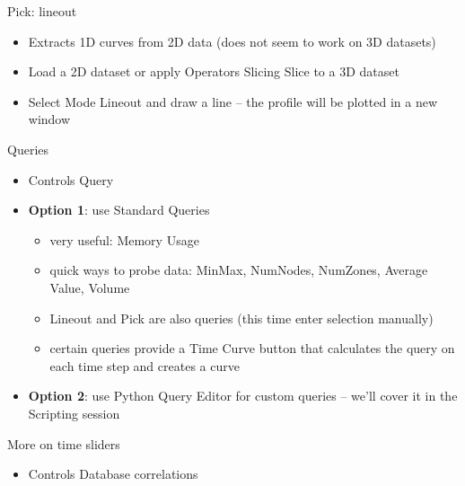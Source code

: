 \begin{frame}{Pick: lineout}
  \begin{itemize}\setlength{\itemsep}{2mm}
  \item Extracts 1D curves from 2D data (does not seem to work on 3D datasets)
  \item Load a 2D dataset or apply Operators \ra Slicing \ra Slice to a 3D dataset
  \item Select Mode \ra Lineout and draw a line -- the profile will be plotted in a new window
  \end{itemize}
\end{frame}

\begin{frame}{Queries}
  \begin{itemize}\setlength{\itemsep}{2mm}
  \item Controls \ra Query
  \item {\bf Option 1}: use Standard Queries
    \begin{itemize}\setlength{\itemsep}{0mm}
    \item very useful: Memory Usage
    \item quick ways to probe data: MinMax, NumNodes, NumZones, Average Value, Volume
    \item Lineout and Pick are also queries (this time enter selection manually)
    \item certain queries provide a Time Curve button that calculates the query on each time step and
      creates a curve
    \end{itemize}
  \item {\bf Option 2}: use Python Query Editor for custom queries -- we'll cover it in the Scripting
    session
  \end{itemize}
\end{frame}

\begin{frame}{More on time sliders}
  \begin{itemize}\setlength{\itemsep}{2mm}
  \item Controls \ra Database correlations
  \end{itemize}
\end{frame}
